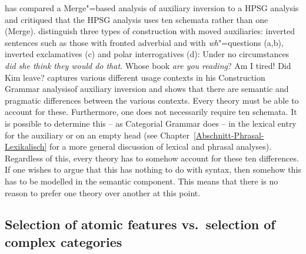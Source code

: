 \citet{Chomsky2010a} has compared a Merge"=based analysis of auxiliary inversion to a HPSG analysis and critiqued that the HPSG analysis uses ten schemata rather than
one (Merge). \citet{GSag2000a-u} distinguish three types of construction with moved auxiliaries:
inverted sentences such as those with fronted adverbial and with \emph{wh}"=questions (a,b), inverted
exclamatives (c) and polar interrogatives (d):
\eal
\ex Under no circumstances \emph{did she think they would do that}.
\ex Whose book \emph{are you reading}?
\ex Am I tired!
\ex Did Kim leave?
\zl
\citet{Fillmore99a} captures various different usage contexts in his Construction Grammar analysis\indexcxg of
auxiliary inversion and shows that there are semantic and pragmatic differences between the various contexts. Every
theory must be able to account for these. Furthermore, one does not necessarily require ten schemata. It is possible
to determine this -- as Categorial Grammar does -- in the lexical entry for the auxiliary or on an empty head (see
Chapter~\ref{Abschnitt-Phrasal-Lexikalisch} for a more general discussion of lexical and phrasal analyses). Regardless of
this, every theory has to somehow account for these ten differences. If one wishes to argue that this has nothing to
do with syntax, then somehow this has to be modelled in the semantic component. This means that there is no reason
to prefer one theory over another at this point.


\subsection{Selection of atomic features vs.\ selection of complex categories}
\label{sec-selection-features-vs-categories}

